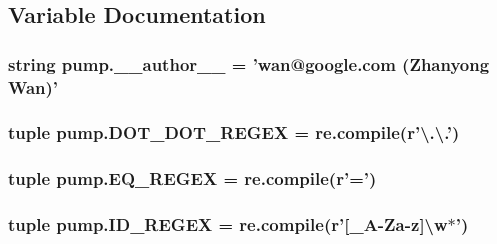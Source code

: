 \subsection{Variable Documentation}
\hypertarget{namespacepump_ab99a065546038823261c774117df0798}{
\subsubsection[{\-\_\-\-\_\-author\-\_\-\-\_\-}]{\setlength{\rightskip}{0pt plus 5cm}string pump.\-\_\-\-\_\-author\-\_\-\-\_\- = 'wan@google.\-com (Zhanyong Wan)'}}\label{namespacepump_ab99a065546038823261c774117df0798}
\hypertarget{namespacepump_a7ceff323392938f56a70e8612f51294c}{
\subsubsection[{D\-O\-T\-\_\-\-D\-O\-T\-\_\-\-R\-E\-G\-E\-X}]{\setlength{\rightskip}{0pt plus 5cm}tuple pump.\-D\-O\-T\-\_\-\-D\-O\-T\-\_\-\-R\-E\-G\-E\-X = re.\-compile(r'\textbackslash{}.\textbackslash{}.')}}\label{namespacepump_a7ceff323392938f56a70e8612f51294c}
\hypertarget{namespacepump_a7f1b6c8a70ec140d90340ae8276143a6}{
\subsubsection[{E\-Q\-\_\-\-R\-E\-G\-E\-X}]{\setlength{\rightskip}{0pt plus 5cm}tuple pump.\-E\-Q\-\_\-\-R\-E\-G\-E\-X = re.\-compile(r'=')}}\label{namespacepump_a7f1b6c8a70ec140d90340ae8276143a6}
\hypertarget{namespacepump_a11804cc01a8aef9c8700d3e44e0b518f}{
\subsubsection[{I\-D\-\_\-\-R\-E\-G\-E\-X}]{\setlength{\rightskip}{0pt plus 5cm}tuple pump.\-I\-D\-\_\-\-R\-E\-G\-E\-X = re.\-compile(r'\mbox{[}\-\_\-\-A-\/Za-\/z\mbox{]}\textbackslash{}w$\ast$')}}\label{namespacepump_a11804cc01a8aef9c8700d3e44e0b518f}
